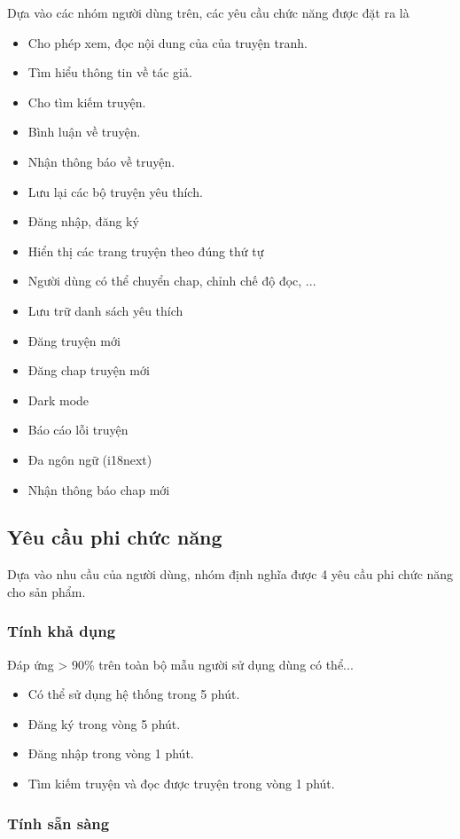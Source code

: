 \documentclass[./../main.tex]{subfiles}
\begin{document}
Dựa vào các nhóm người dùng trên, các yêu cầu chức năng được đặt ra là
\begin{itemize}
	\item Cho phép xem, đọc nội dung của của truyện tranh.
	\item Tìm hiểu thông tin về tác giả.
	\item Cho tìm kiếm truyện.
	\item Bình luận về truyện.
	\item Nhận thông báo về truyện.
	\item Lưu lại các bộ truyện yêu thích.
	\item Đăng nhập, đăng ký
	\item Hiển thị các trang truyện theo đúng thứ tự
	\item Người dùng có thể chuyển chap, chỉnh chế độ đọc, ...
	\item Lưu trữ danh sách yêu thích
	\item Đăng truyện mới
	\item Đăng chap truyện mới
	\item Dark mode
	\item Báo cáo lỗi truyện
	\item Đa ngôn ngữ (i18next)
	\item Nhận thông báo chap mới
\end{itemize}

\subsection{Yêu cầu phi chức năng}

Dựa vào nhu cầu của người dùng, nhóm định nghĩa được 4 yêu cầu phi chức năng cho sản phẩm.

\subsubsection{Tính khả dụng}

Đáp ứng > 90\% trên toàn bộ mẫu người sử dụng dùng có thể...
\begin{itemize}
	\item Có thể sử dụng hệ thống trong 5 phút.
	\item Đăng ký trong vòng 5 phút.
	\item Đăng nhập trong vòng 1 phút.
	\item Tìm kiếm truyện và đọc được truyện trong vòng 1 phút.
\end{itemize}

\subsubsection{Tính sẵn sàng}
\end{document}
